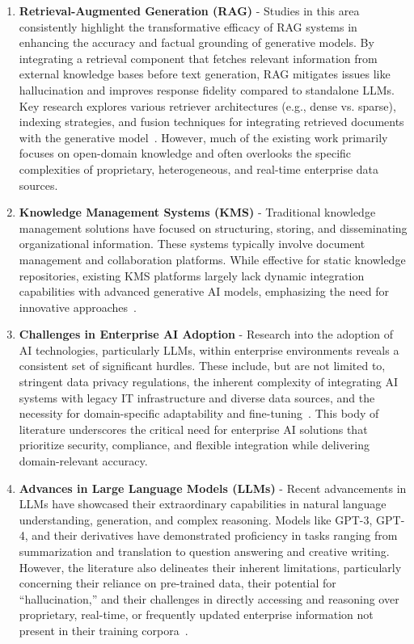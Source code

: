 \documentclass[default]{sn-jnl}%
\begin{document}
\begin{enumerate}
    \item \textbf{Retrieval-Augmented Generation (RAG)} - Studies in this area consistently highlight the transformative efficacy of RAG systems in enhancing the accuracy and factual grounding of generative models. By integrating a retrieval component that fetches relevant information from external knowledge bases before text generation, RAG mitigates issues like hallucination and improves response fidelity compared to standalone LLMs. Key research explores various retriever architectures (e.g., dense vs. sparse), indexing strategies, and fusion techniques for integrating retrieved documents with the generative model~\cite{ref1}. However, much of the existing work primarily focuses on open-domain knowledge and often overlooks the specific complexities of proprietary, heterogeneous, and real-time enterprise data sources.
    \item \textbf{Knowledge Management Systems (KMS)} - Traditional knowledge management solutions have focused on structuring, storing, and disseminating organizational information. These systems typically involve document management and collaboration platforms. While effective for static knowledge repositories, existing KMS platforms largely lack dynamic integration capabilities with advanced generative AI models, emphasizing the need for innovative approaches~\cite{ref2,ref3}.
    \item \textbf{Challenges in Enterprise AI Adoption} - Research into the adoption of AI technologies, particularly LLMs, within enterprise environments reveals a consistent set of significant hurdles. These include, but are not limited to, stringent data privacy regulations, the inherent complexity of integrating AI systems with legacy IT infrastructure and diverse data sources, and the necessity for domain-specific adaptability and fine-tuning~\cite{ref4,ref5}. This body of literature underscores the critical need for enterprise AI solutions that prioritize security, compliance, and flexible integration while delivering domain-relevant accuracy.
    \item \textbf{Advances in Large Language Models (LLMs)} - Recent advancements in LLMs have showcased their extraordinary capabilities in natural language understanding, generation, and complex reasoning. Models like GPT-3, GPT-4, and their derivatives have demonstrated proficiency in tasks ranging from summarization and translation to question answering and creative writing. However, the literature also delineates their inherent limitations, particularly concerning their reliance on pre-trained data, their potential for ``hallucination,'' and their challenges in directly accessing and reasoning over proprietary, real-time, or frequently updated enterprise information not present in their training corpora~\cite{ref6}.

\end{enumerate}
\end{document}
